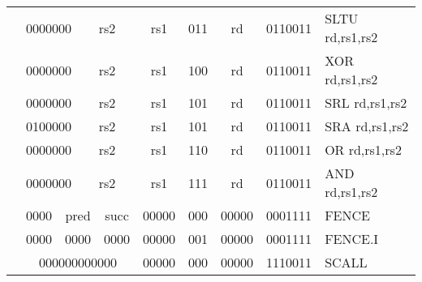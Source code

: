 \begin{table}[p]
\begin{small}
\begin{center}
\begin{tabular}{p{0in}p{0.4in}p{0.05in}p{0.05in}p{0.05in}p{0.05in}p{0.4in}p{0.6in}p{0.4in}p{0.6in}p{0.7in}l}
&
\multicolumn{4}{|c|}{0000000} &
\multicolumn{2}{c|}{rs2} &
\multicolumn{1}{c|}{rs1} &
\multicolumn{1}{c|}{011} &
\multicolumn{1}{c|}{rd} &
\multicolumn{1}{c|}{0110011} & SLTU rd,rs1,rs2 \\
\cline{2-11}
  

&
\multicolumn{4}{|c|}{0000000} &
\multicolumn{2}{c|}{rs2} &
\multicolumn{1}{c|}{rs1} &
\multicolumn{1}{c|}{100} &
\multicolumn{1}{c|}{rd} &
\multicolumn{1}{c|}{0110011} & XOR rd,rs1,rs2 \\
\cline{2-11}
  

&
\multicolumn{4}{|c|}{0000000} &
\multicolumn{2}{c|}{rs2} &
\multicolumn{1}{c|}{rs1} &
\multicolumn{1}{c|}{101} &
\multicolumn{1}{c|}{rd} &
\multicolumn{1}{c|}{0110011} & SRL rd,rs1,rs2 \\
\cline{2-11}
  

&
\multicolumn{4}{|c|}{0100000} &
\multicolumn{2}{c|}{rs2} &
\multicolumn{1}{c|}{rs1} &
\multicolumn{1}{c|}{101} &
\multicolumn{1}{c|}{rd} &
\multicolumn{1}{c|}{0110011} & SRA rd,rs1,rs2 \\
\cline{2-11}
  

&
\multicolumn{4}{|c|}{0000000} &
\multicolumn{2}{c|}{rs2} &
\multicolumn{1}{c|}{rs1} &
\multicolumn{1}{c|}{110} &
\multicolumn{1}{c|}{rd} &
\multicolumn{1}{c|}{0110011} & OR rd,rs1,rs2 \\
\cline{2-11}
  

&
\multicolumn{4}{|c|}{0000000} &
\multicolumn{2}{c|}{rs2} &
\multicolumn{1}{c|}{rs1} &
\multicolumn{1}{c|}{111} &
\multicolumn{1}{c|}{rd} &
\multicolumn{1}{c|}{0110011} & AND rd,rs1,rs2 \\
\cline{2-11}
  

&
\multicolumn{2}{|c|}{0000} &
\multicolumn{3}{c|}{pred} &
\multicolumn{1}{c|}{succ} &
\multicolumn{1}{c|}{00000} &
\multicolumn{1}{c|}{000} &
\multicolumn{1}{c|}{00000} &
\multicolumn{1}{c|}{0001111} & FENCE  \\
\cline{2-11}
  

&
\multicolumn{2}{|c|}{0000} &
\multicolumn{3}{c|}{0000} &
\multicolumn{1}{c|}{0000} &
\multicolumn{1}{c|}{00000} &
\multicolumn{1}{c|}{001} &
\multicolumn{1}{c|}{00000} &
\multicolumn{1}{c|}{0001111} & FENCE.I  \\
\cline{2-11}
  

&
\multicolumn{6}{|c|}{000000000000} &
\multicolumn{1}{c|}{00000} &
\multicolumn{1}{c|}{000} &
\multicolumn{1}{c|}{00000} &
\multicolumn{1}{c|}{1110011} & SCALL  \\
\cline{2-11}
  


\end{tabular}
\end{center}
\end{small}
\end{table}
